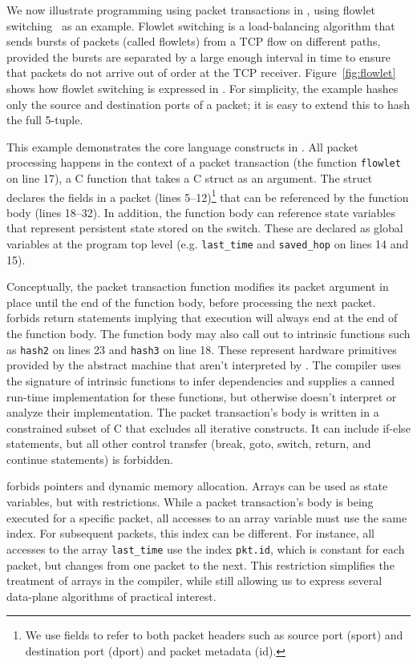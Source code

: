 We now illustrate programming using packet transactions in \pktlanguage, using
flowlet switching~\cite{flowlets} as an example. Flowlet switching is a
load-balancing algorithm that sends bursts of packets (called flowlets) from a
TCP flow on different paths, provided the bursts are separated by a large
enough interval in time to ensure that packets do not arrive out of order at
the TCP receiver. Figure~\ref{fig:flowlet} shows how flowlet switching is
expressed in \pktlanguage. For simplicity, the example hashes only the source
and destination ports of a packet; it is easy to extend this to hash the full
5-tuple.

This example demonstrates the core language constructs in \pktlanguage. All
packet processing happens in the context of a packet transaction (the function
\texttt{flowlet} on line 17), a C function that takes a C struct as an
argument. The struct declares the fields in a packet (lines 5--12)\footnote{We
  use fields to refer to both packet headers such as source port (sport) and
destination port (dport) and packet metadata (id).} that can be referenced by the
function body (lines 18--32).  In addition, the function body can reference
state variables that represent persistent state stored on the switch. These are
declared as global variables at the program top level (e.g. \texttt{last\_time}
and \texttt{saved\_hop} on lines 14 and 15).

Conceptually, the packet transaction function modifies its packet argument in
place until the end of the function body, before processing the next packet.
\pktlanguage forbids return statements implying that execution will always end at the
end of the function body. The function body may also call out to intrinsic
functions such as \texttt{hash2} on lines 23 and \texttt{hash3} on line 18.
These represent hardware primitives provided by the abstract machine that
aren't interpreted by \pktlanguage. The \pktlanguage compiler uses the
signature of intrinsic functions to infer dependencies and supplies a canned
run-time implementation for these functions, but otherwise doesn't interpret or
analyze their implementation. The packet
transaction's body is written in a constrained subset of C that excludes all
iterative constructs. It can include if-else statements,
but all other control transfer (break, goto, switch, return, and continue
statements) is forbidden.

\pktlanguage forbids pointers and dynamic memory allocation. Arrays can be used
as state variables, but with restrictions. While a packet transaction's body is
being executed for a specific packet, all accesses to an array variable must use the
same index. For subsequent packets, this index can be different. For instance,
all accesses to the array \texttt{last\_time} use the
index \texttt{pkt.id}, which is constant for each packet, but changes from one
packet to the next. This restriction simplifies the treatment of arrays in the
compiler, while still allowing us to express several data-plane algorithms of
practical interest.
%
%

